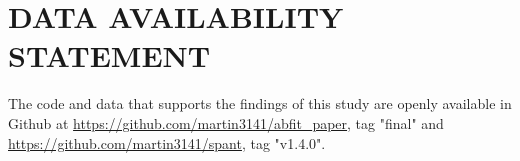 \documentclass[num-refs]{wiley-article}
\begin{document}
\section*{DATA AVAILABILITY STATEMENT}
\begin{flushleft}
    The code and data that supports the findings of this study are openly available in Github at \linebreak \url{https://github.com/martin3141/abfit_paper}, tag "final" and \linebreak \url{https://github.com/martin3141/spant}, tag "v1.4.0".
\end{flushleft}




\clearpage
\listoffigures
\end{document}
